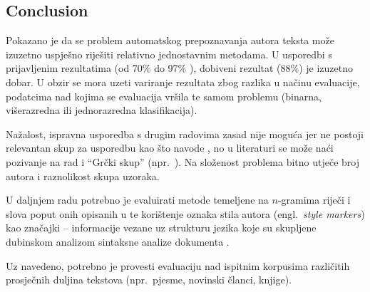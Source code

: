 \documentclass[11pt,english]{article}
\newcommand{\engl}[1]{(engl.~\emph{#1})}
\renewcommand{\labelitemi}{\textendash}
\renewenvironment{itemize}{%
\begin{list}{\labelitemi}{%
\setlength{\topsep}{0mm}
\setlength{\itemsep}{-1mm}
\setlength{\labelindent}{\parindent}
\setlength{\leftmargin}{6mm}}}
{\end{list}}
\begin{document}
\begin{multicols}{2}
\section{Conclusion}
Pokazano je da se problem automatskog prepoznavanja autora teksta može izuzetno
uspješno riješiti relativno jednostavnim metodama. U usporedbi s prijavljenim
rezultatima (od 70\% do 97\%
\citep{coyotl2006authorship,keselj2003n,luyckx2005shallow,stamatatos2001computer,stamatatos1999automatic}),
dobiveni rezultat (88\%) je izuzetno dobar. U obzir se mora uzeti variranje
rezultata zbog razlika u načinu evaluacije, podatcima nad kojima se evaluacija
vršila te samom problemu (binarna, višerazredna ili jednorazredna
klasifikacija).

Nažalost, ispravna usporedba s drugim radovima zasad nije moguća jer ne postoji
relevantan skup za usporedbu kao što navode \citep{zhao2005effective}, no u
literaturi se može naći pozivanje na rad
\citep{stamatatos2001computer,stamatatos1999automatic} i ``Grčki skup''
(npr.~\citep{keselj2003n}). Na složenost problema bitno utječe broj autora i
raznolikost skupa uzoraka.

U daljnjem radu potrebno je evaluirati metode temeljene na $n$-gramima riječi i
slova poput onih opisanih u
\citep{keselj2003n,peng2003language,coyotl2006authorship} te korištenje oznaka
stila autora \engl{style markers} kao značajki – informacije vezane uz strukturu
jezika koje su skupljene dubinskom analizom sintaksne analize dokumenta
\citep{stamatatos2001computer,diri2003automatic,luyckx2005shallow}.

Uz navedeno, potrebno je provesti evaluaciju nad ispitnim korpusima različitih
prosječnih duljina tekstova (npr.~pjesme, novinski članci, knjige).





\end{multicols}
\end{document}
